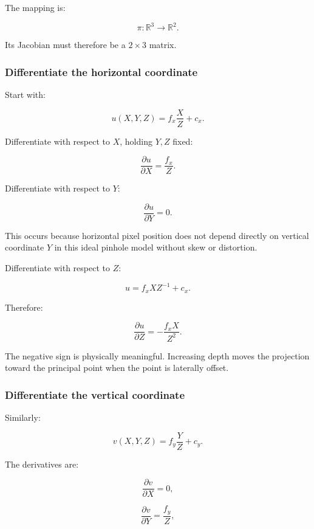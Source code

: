 The mapping is:

\[
\pi:\mathbb R^3\rightarrow\mathbb R^2.
\]

Its Jacobian must therefore be a \(2\times3\) matrix.

\subsubsection{Differentiate the horizontal coordinate}\label{02-foundations-ii-ch021-differentiate-the-horizontal-coordinate}

\hypertarget{02-foundations-ii-ch021-differentiate-the-horizontal-coordinate}{}

Start with:

\[
u(X,Y,Z)=f_x\frac XZ+c_x.
\]

Differentiate with respect to \(X\), holding \(Y,Z\) fixed:

\[
\boxed{\frac{\partial u}{\partial X}=\frac{f_x}{Z}}.
\]

Differentiate with respect to \(Y\):

\[
\boxed{\frac{\partial u}{\partial Y}=0}.
\]

This occurs because horizontal pixel position does not depend directly on vertical coordinate \(Y\) in this ideal pinhole model without skew or distortion.

Differentiate with respect to \(Z\):

\[
u=f_xXZ^{-1}+c_x.
\]

Therefore:

\[
\boxed{ \frac{\partial u}{\partial Z} =-\frac{f_xX}{Z^2} }.
\]

The negative sign is physically meaningful. Increasing depth moves the projection toward the principal point when the point is laterally offset.

\subsubsection{Differentiate the vertical coordinate}\label{02-foundations-ii-ch021-differentiate-the-vertical-coordinate}

\hypertarget{02-foundations-ii-ch021-differentiate-the-vertical-coordinate}{}

Similarly:

\[
v(X,Y,Z)=f_y\frac YZ+c_y.
\]

The derivatives are:

\[
\frac{\partial v}{\partial X}=0,
\]

\[
\frac{\partial v}{\partial Y}=\frac{f_y}{Z},
\]

